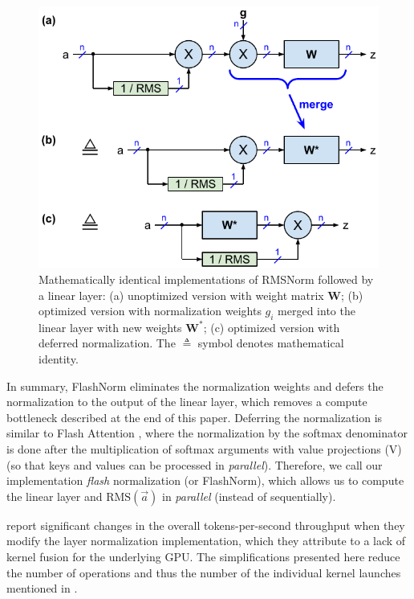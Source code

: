 \documentclass{article}
\numberwithin{equation}{section} %
\newcommand{\mat}[1]{\mathbf{#1}}     %
\def\rms{\text{RMS}(\vec{a})}         %
\def\W*{\mat{W}^\ast}                 %
\begin{document}
\begin{figure}[h!] \centering  %
  \includegraphics[scale=0.9]{../doc/fig/flashNorm_fig1.pdf}
  \caption{Mathematically identical implementations of RMSNorm followed by a linear layer: (a) unoptimized version with weight matrix $\mat{W}$; (b) optimized version with normalization weights $g_i$ merged into the linear layer with new weights $\W*$; (c) optimized version with deferred normalization. The $\triangleq$ symbol denotes mathematical identity.}
\label{fig1} \end{figure}

In summary, FlashNorm eliminates the normalization weights and defers the normalization to the output of the linear layer, which removes a compute bottleneck described at the end of this paper. Deferring the normalization is similar to Flash Attention \citep{flash-attention}, where the normalization by the softmax denominator is done after the multiplication of softmax arguments with value projections (V) (so that keys and values can be processed in \emph{parallel}). Therefore, we call our implementation \emph{flash} normalization (or FlashNorm), which allows us to compute the linear layer and $\rms$ in \emph{parallel} (instead of sequentially).

\citeauthor{openelm} report significant changes in the overall tokens-per-second throughput when they modify the layer normalization implementation, which they attribute to a lack of kernel fusion for the underlying GPU. The simplifications presented here reduce the number of operations and thus the number of the individual kernel launches mentioned in \citep{openelm}.
\end{document}
